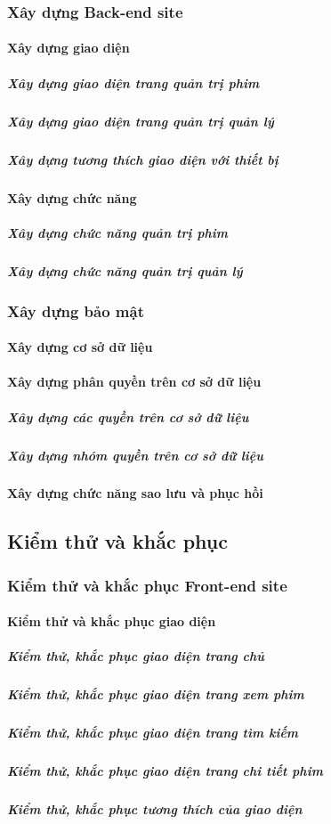 \documentclass[a4paper]{book}
\begin{document}
\subsubsection{Xây dựng Back-end site}
\paragraph{Xây dựng giao diện}
\subparagraph{Xây dựng giao diện trang quản trị phim}
\subparagraph{Xây dựng giao diện trang quản trị quản lý}
\subparagraph{Xây dựng tương thích giao diện với thiết bị}
\paragraph{Xây dựng chức năng}
\subparagraph{Xây dựng chức năng quản trị phim}
\subparagraph{Xây dựng chức năng quản trị quản lý}
\subsubsection{Xây dựng bảo mật}
\paragraph{Xây dựng cơ sở dữ liệu}
\paragraph{Xây dựng phân quyền trên cơ sở dữ liệu}
\subparagraph{Xây dựng các quyền trên cơ sở dữ liệu}
\subparagraph{Xây dựng nhóm quyền trên cơ sở dữ liệu}
\paragraph{Xây dựng chức năng sao lưu và phục hồi}
\subsection{Kiểm thử và khắc phục}
\subsubsection{Kiểm thử và khắc phục Front-end site}
\paragraph{Kiểm thử và khắc phục giao diện}
\subparagraph{Kiểm thử, khắc phục giao diện trang chủ}
\subparagraph{Kiểm thử, khắc phục giao diện trang xem phim}
\subparagraph{Kiểm thử, khắc phục giao diện trang tìm kiếm}
\subparagraph{Kiểm thử, khắc phục giao diện trang chi tiết phim}
\subparagraph{Kiểm thử, khắc phục tương thích của giao diện}
\end{document}
